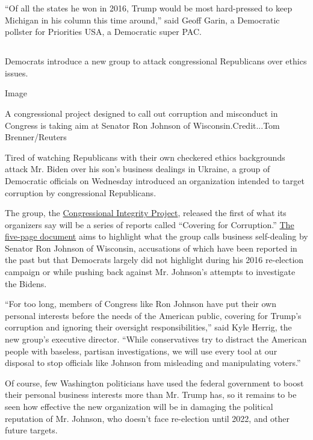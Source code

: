 ``Of all the states he won in 2016, Trump would be most hard-pressed to
keep Michigan in his column this time around,'' said Geoff Garin, a
Democratic pollster for Priorities USA, a Democratic super PAC.

\hypertarget{-6}{%
\subsection{}\label{-6}}

Democrats introduce a new group to attack congressional Republicans over
ethics issues.

Image

A congressional project designed to call out corruption and misconduct
in Congress is taking aim at Senator Ron Johnson of
Wisconsin.Credit...Tom Brenner/Reuters

Tired of watching Republicans with their own checkered ethics
backgrounds attack Mr. Biden over his son's business dealings in
Ukraine, a group of Democratic officials on Wednesday introduced an
organization intended to target corruption by congressional Republicans.

The group, the \href{https://congressionalintegrity.org/}{Congressional
Integrity Project}, released the first of what its organizers say will
be a series of reports called ``Covering for Corruption.''
\href{https://congressionalintegrity.org/wp-content/uploads/2020/07/CIP_Report_FINAL_07272020.pdf}{The
five-page document} aims to highlight what the group calls business
self-dealing by Senator Ron Johnson of Wisconsin, accusations of which
have been reported in the past but that Democrats largely did not
highlight during his 2016 re-election campaign or while pushing back
against Mr. Johnson's attempts to investigate the Bidens.

``For too long, members of Congress like Ron Johnson have put their own
personal interests before the needs of the American public, covering for
Trump's corruption and ignoring their oversight responsibilities,'' said
Kyle Herrig, the new group's executive director. ``While conservatives
try to distract the American people with baseless, partisan
investigations, we will use every tool at our disposal to stop officials
like Johnson from misleading and manipulating voters.''

Of course, few Washington politicians have used the federal government
to boost their personal business interests more than Mr. Trump has, so
it remains to be seen how effective the new organization will be in
damaging the political reputation of Mr. Johnson, who doesn't face
re-election until 2022, and other future targets.


